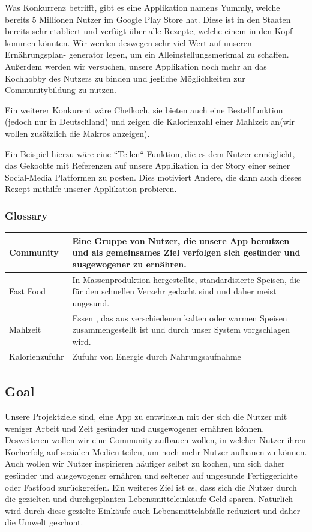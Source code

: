 \documentclass[12pt]{article}
\theoremstyle{definition}
\begin{document}
Was Konkurrenz betrifft, gibt es eine Applikation namens Yummly, welche bereits 5 Millionen Nutzer im Google Play Store hat. Diese ist in den Staaten bereits sehr etabliert und verfügt über alle Rezepte, welche einem in den Kopf kommen könnten. Wir werden deswegen sehr viel Wert auf unseren Ernährungsplan- generator legen, um ein Alleinstellungsmerkmal zu schaffen. Außerdem werden wir versuchen, unsere Applikation noch mehr an das Kochhobby des Nutzers zu binden und jegliche Möglichkeiten zur Communitybildung zu nutzen.

Ein weiterer Konkurent wäre Chefkoch, sie bieten auch eine Bestellfunktion (jedoch nur in Deutschland) und zeigen die Kalorienzahl einer Mahlzeit an(wir wollen zusätzlich die Makros anzeigen). 

Ein Beispiel hierzu wäre eine ``Teilen`` Funktion, die es dem Nutzer ermöglicht, das Gekochte mit Referenzen auf unsere Applikation in der Story einer seiner Social-Media Platformen zu posten. Dies motiviert Andere, die dann auch dieses Rezept mithilfe unserer Applikation probieren.


\subsubsection{Glossary}
\begin{tabular}{|p{.2\linewidth}|p{.65\linewidth}|}
\hline
Community & Eine Gruppe von Nutzer, die unsere App benutzen und als gemeinsames Ziel verfolgen sich gesünder und ausgewogener zu ernähren. \\
\hline 
Fast Food & In Massenproduktion hergestellte, standardisierte Speisen, die für den schnellen Verzehr gedacht sind und daher meist ungesund.  \\ 
\hline 
Mahlzeit & Essen , das aus verschiedenen kalten oder warmen Speisen zusammengestellt ist und durch unser System vorgschlagen wird.\\ \hline
Kalorienzufuhr & Zufuhr von Energie durch Nahrungsaufnahme   \\ 
\hline 
\end{tabular}


\subsection{Goal}
Unsere Projektziele sind, eine App zu entwickeln mit der sich die Nutzer mit weniger Arbeit und Zeit gesünder und ausgewogener ernähren können. Desweiteren wollen wir eine Community aufbauen wollen, in welcher Nutzer ihren Kocherfolg auf sozialen Medien teilen, um noch mehr Nutzer aufbauen zu können. Auch wollen wir Nutzer inspirieren häufiger selbst zu kochen, um sich daher gesünder und ausgewogener ernähren und seltener auf ungesunde Fertiggerichte oder Fastfood zurückgreifen. Ein weiteres Ziel ist es, dass sich die Nutzer durch die gezielten und durchgeplanten Lebensmitteleinkäufe Geld sparen. Natürlich wird durch diese gezielte Einkäufe auch Lebensmittelabfälle reduziert und daher die Umwelt geschont.
\pagebreak
\end{document}
